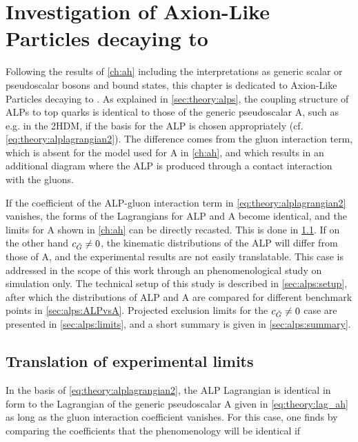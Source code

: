 \chapter{Investigation of Axion-Like Particles decaying to \ttbartitle}
\label{ch:alps}

Following the results of \cref{ch:ah} including the interpretations as generic scalar or pseudoscalar bosons and \ttbar bound states, this chapter is dedicated to Axion-Like Particles decaying to \ttbar. As explained in \cref{sec:theory:alps}, the coupling structure of ALPs to top quarks is identical to those of the generic pseudoscalar A, such as e.g. in the 2HDM, if the basis for the ALP is chosen appropriately (cf. \cref{eq:theory:alplagrangian2}). The difference comes from the gluon interaction term, which is absent for the model used for A in \cref{ch:ah}, and which results in an additional diagram where the ALP is produced through a contact interaction with the gluons. 

If the coefficient \cG of the ALP-gluon interaction term in \cref{eq:theory:alplagrangian2} vanishes, the forms of the Lagrangians for ALP and A become identical, and the limits for A shown in \cref{ch:ah} can be directly recasted. This is done in \cref{sec:alps:translation}. If on the other hand $c_{\tilde{G}} \neq 0$, the kinematic distributions of the ALP will differ from those of A, and the experimental results are not easily translatable. This case is addressed in the scope of this work through an phenomenological study on simulation only. The technical setup of this study is described in \cref{sec:alps:setup}, after which the distributions of ALP and A are compared for different benchmark points in \cref{sec:alps:ALPvsA}. Projected exclusion limits for the $c_{\tilde{G}} \neq 0$ case are presented in \cref{sec:alps:limits}, and a short summary is given in \cref{sec:alps:summary}.


\section{Translation of experimental limits}
\label{sec:alps:translation}

In the basis of \cref{eq:theory:alplagrangian2}, the ALP Lagrangian is identical in form to the Lagrangian of the generic pseudoscalar A given in \cref{eq:theory:lag_ah} as long as the gluon interaction coefficient \cG vanishes. For this case, one finds by comparing the coefficients that the phenomenology will be identical if

